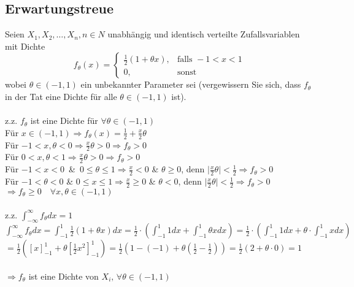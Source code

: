 \documentclass[a4paper]{article}
\begin{document}
\setcounter{section}{11}
\subsection{Erwartungstreue}
Seien $X_1,X_2,\dots ,X_n, n\in N$ unabhängig und identisch verteilte Zufallsvariablen mit Dichte
\[f_\theta (x)=\begin{cases}
    \frac{1}{2}(1+\theta x), & \text{falls } -1 < x < 1\\
    0, & \text{sonst}
\end{cases}\]
wobei $\theta \in (-1,1)$ ein unbekannter Parameter sei (vergewissern Sie sich, dass $f_\theta$ in der Tat eine Dichte für alle $\theta\in(-1,1)$ ist).\\\\
z.z. $f_\theta$ ist eine Dichte für $ \forall \theta \in (-1,1)$\\
Für \(x \in (-1,1) \Rightarrow f_\theta(x)=\frac{1}{2}+\frac{x}{2}\theta\)\\
Für \(-1 < x, \theta < 0 \Rightarrow \frac{x}{2}\theta > 0 \Rightarrow f_\theta >0\)\\
Für \(0 < x,\theta < 1 \Rightarrow \frac{x}{2}\theta > 0 \Rightarrow f_\theta > 0\)\\
Für \(-1 < x < 0\)\, \&\, \(0 \leq \theta \leq 1 \Rightarrow \frac{x}{2}<0\) \& \(\theta \geq 0\), denn \(\vert \frac{x}{2}\theta\vert <\frac{1}{2} \Rightarrow f_\theta >0\)\\
Für \(-1 < \theta < 0\) \& \(0 \leq x \leq 1 \Rightarrow \frac{x}{2}\geq 0\) \& \(\theta < 0\), denn \(\vert \frac{x}{2}\theta\vert <\frac{1}{2} \Rightarrow f_\theta >0\)\\
\(\Rightarrow f_\theta \geq 0\quad \forall x, \theta \in (-1,1)\)\\\\
z.z. \(\int^\infty_{-\infty}f_\theta dx = 1\)\\
\hspace*{0.65cm}\(\int^\infty_{-\infty}f_\theta dx =\int^1_{-1}\frac{1}{2}(1+\theta x)dx = \frac{1}{2} \cdot \left(\int^1_{-1} 1 dx + \int^1_{-1}\theta x dx\right) = \frac{1}{2}\cdot \left(\int^1_{-1} 1 dx + \theta \cdot \int^1_{-1} x dx\right)\)\\
\hspace*{2.2cm}\(=\frac{1}{2}\left([x]^1_{-1}+\theta \left[\frac{1}{2}x^2\right]^1_{-1}\right)= \frac{1}{2}\left(1-(-1)+\theta\left(\frac{1}{2}-\frac{1}{2}\right)\right)=\frac{1}{2}(2+\theta\cdot 0)=1\)\\\\
\(\Rightarrow f_\theta\) ist eine Dichte von \(X_i,\, \forall \theta \in (-1,1)\)\\\\
\end{document}
